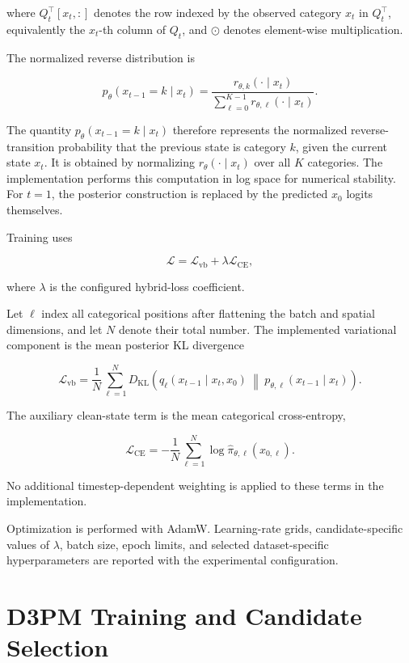 where \(Q_t^\top[x_t,:]\) denotes the row indexed by the observed category \(x_t\) in \(Q_t^\top\), equivalently the \(x_t\)-th column of \(Q_t\), and \(\odot\) denotes element-wise multiplication.

The normalized reverse distribution is

\[
p_\theta
\left(
x_{t-1}=k
\mid
x_t
\right)
=
\frac{
r_{\theta,k}(\cdot\mid x_t)
}{
\sum_{\ell=0}^{K-1}
r_{\theta,\ell}(\cdot\mid x_t)
}.
\]

The quantity \(p_\theta(x_{t-1}=k\mid x_t)\) therefore represents the normalized reverse-transition probability that the previous state is category \(k\), given the current state \(x_t\). It is obtained by normalizing \(r_\theta(\cdot\mid x_t)\) over all \(K\) categories.
The implementation performs this computation in log space for numerical stability. For \(t=1\), the posterior construction is replaced by the predicted \(x_0\) logits themselves.

Training uses

\[
\mathcal{L}
=
\mathcal{L}_{\mathrm{vb}}
+
\lambda
\mathcal{L}_{\mathrm{CE}},
\]

where \(\lambda\) is the configured hybrid-loss coefficient.

Let \(\ell\) index all categorical positions after flattening the batch and spatial dimensions, and let \(N\) denote their total number. The implemented variational component is the mean posterior KL divergence

\[
\mathcal{L}_{\mathrm{vb}}
=
\frac{1}{N}
\sum_{\ell=1}^{N}
D_{\mathrm{KL}}
\left(
q_\ell
\left(
x_{t-1}
\mid
x_t,x_0
\right)
\;\middle\Vert\;
p_{\theta,\ell}
\left(
x_{t-1}
\mid
x_t
\right)
\right).
\]

The auxiliary clean-state term is the mean categorical cross-entropy,

\[
\mathcal{L}_{\mathrm{CE}}
=
-\frac{1}{N}
\sum_{\ell=1}^{N}
\log
\widehat{\pi}_{\theta,\ell}
\left(
x_{0,\ell}
\right).
\]

No additional timestep-dependent weighting is applied to these terms in the implementation.

Optimization is performed with AdamW. Learning-rate grids, candidate-specific values of \(\lambda\), batch size, epoch limits, and selected dataset-specific hyperparameters are reported with the experimental configuration.


\section{D3PM Training and Candidate Selection}
\label{sec:method_d3pm_selection}

